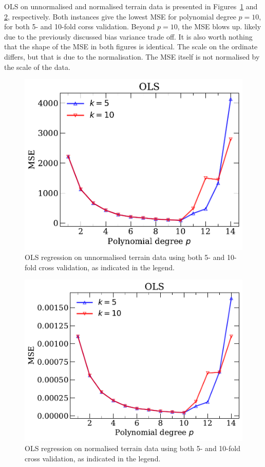 \documentclass[a4paper, 
amsfonts, 
amssymb, 
amsmath, 
reprint, 
showkeys, 
nofootinbib, 
twoside]{revtex4-2}
\begin{document}
OLS on unnormalised and normalised terrain data is presented in Figures~\ref{fig:ols_terrain_non} and \ref{fig:ols_terrain}, respectively. Both instances give the lowest MSE for polynomial degree $p = 10$, for both 5- and 10-fold corss validation. Beyond $p = 10$, the MSE blows up. likely due to the previously discussed bias variance trade off. It is also worth nothing that the shape of the MSE in both figures is identical. The scale on the ordinate differs, but that is due to the normalisation. The MSE itself is not normalised by the scale of the data. 

\begin{figure}
    \centering
    \includegraphics[width = \columnwidth]{Figures/terrain_unscaled_ols.pdf}
    \caption{OLS regression on unnormalised terrain data using both 5- and 10-fold cross validation, as indicated in the legend. }
    \label{fig:ols_terrain_non}
\end{figure}

\begin{figure} [h!]
    \centering
    \includegraphics[width = \columnwidth]{Figures/terrain_scaled_ols.pdf}
    \caption{OLS regression on normalised terrain data using both 5- and 10-fold cross validation, as indicated in the legend.}
    \label{fig:ols_terrain}
\end{figure}
\end{document}
